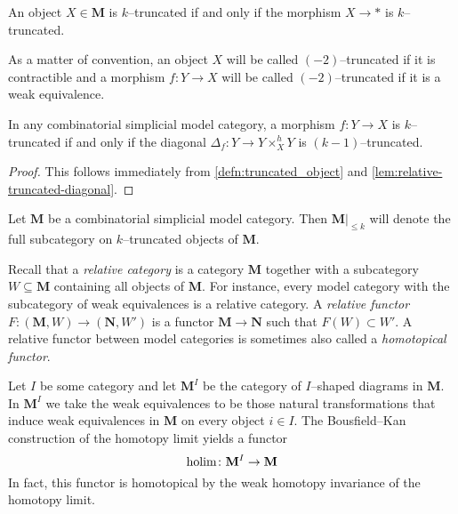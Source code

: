 \begin{remark}
  An object \(X\in\mathbf M\) is \(k\)--truncated if and only if the
  morphism \(X\to *\) is \(k\)--truncated.
\end{remark}

As a matter of convention, an object \(X\) will be called
\((-2)\)--truncated if it is contractible and a morphism \(f\colon
Y\to X\) will be called \((-2)\)--truncated if it is a weak
equivalence.

\begin{corollary}\label{cor:general-diagonal-truncated}
  In any combinatorial simplicial model category, a morphism \(f\colon
  Y\to X\) is \(k\)--truncated if and only if the diagonal
  \(\Delta_{f}\colon Y\to Y\times^{h}_{X} Y\) is
  \((k-1)\)--truncated.
\end{corollary}
\begin{proof}
  This follows immediately from \autoref{defn:truncated_object} and
  \autoref{lem:relative-truncated-diagonal}.
\end{proof}

\begin{definition}
  Let \(\mathbf{M}\) be a combinatorial simplicial model
  category. Then \(\mathbf{M}|_{{\leq}k}\) will denote the full
  subcategory on \(k\)--truncated objects of \(\mathbf{M}\).
\end{definition}

Recall that a \emph{relative category} is a category \(\mathbf{M}\)
together with a subcategory \(W\subseteq \mathbf{M}\) containing all
objects of \(\mathbf{M}\). For instance, every model category with the
subcategory of weak equivalences is a relative category. A
\emph{relative functor} \(F\colon (\mathbf{M},W) \to (\mathbf{N},W')\)
is a functor \(\mathbf{M}\to\mathbf{N}\) such that \(F(W)\subset
W'\). A relative functor between model categories is sometimes also
called a \emph{homotopical functor}.

\begin{remark}\label{rem:holim-homotopical}
  Let \(I\) be some category and let \(\mathbf{M}^{I}\) be the
  category of \(I\)--shaped diagrams in \(\mathbf{M}\). In
  \(\mathbf{M}^{I}\) we take the weak equivalences to be those natural
  transformations that induce weak equivalences in \(\mathbf{M}\) on
  every object \(i\in I\). The Bousfield--Kan construction of the
  homotopy limit yields a functor
\[
\operatorname*{\textnormal{holim}}\colon \mathbf{M}^I \to \mathbf{M}
\]
  In fact, this functor is homotopical by the weak homotopy invariance
  of the homotopy limit.
\end{remark}

